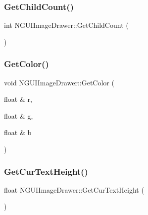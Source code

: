 \hypertarget{class_n_g_u_i_image_drawer_a467d2535f48cebe477b3fa62b3a69f1b}{}\label{class_n_g_u_i_image_drawer_a467d2535f48cebe477b3fa62b3a69f1b} 
\subsubsection{\texorpdfstring{Get\+Child\+Count()}{GetChildCount()}}
{\footnotesize\ttfamily int N\+G\+U\+I\+Image\+Drawer\+::\+Get\+Child\+Count (\begin{DoxyParamCaption}{ }\end{DoxyParamCaption})}

\hypertarget{class_n_g_u_i_image_drawer_a18a87cb25dca912a16eaf50e66436e8b}{}\label{class_n_g_u_i_image_drawer_a18a87cb25dca912a16eaf50e66436e8b} 
\subsubsection{\texorpdfstring{Get\+Color()}{GetColor()}}
{\footnotesize\ttfamily void N\+G\+U\+I\+Image\+Drawer\+::\+Get\+Color (\begin{DoxyParamCaption}\item[{float \&}]{r,  }\item[{float \&}]{g,  }\item[{float \&}]{b }\end{DoxyParamCaption})}

\hypertarget{class_n_g_u_i_image_drawer_a6e985a27993e6c486bc40b3d0561b57b}{}\label{class_n_g_u_i_image_drawer_a6e985a27993e6c486bc40b3d0561b57b} 
\subsubsection{\texorpdfstring{Get\+Cur\+Text\+Height()}{GetCurTextHeight()}}
{\footnotesize\ttfamily float N\+G\+U\+I\+Image\+Drawer\+::\+Get\+Cur\+Text\+Height (\begin{DoxyParamCaption}{ }\end{DoxyParamCaption})}

